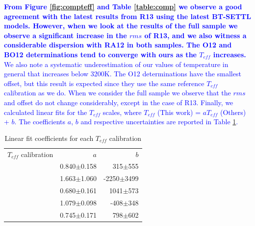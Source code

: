 \documentclass{aa}
\begin{document}
\textcolor{blue}{\textbf{From Figure \ref{fig:compteff} and Table \ref{table:comp} we observe a good agreement with the latest results from R13 using the latest BT-SETTL models. However, when we look at the results of the full sample we observe a significant increase in the $rms$ of R13, and we also witness a considerable dispersion with RA12 in both samples. The O12 and BO12 determinations tend to converge with ours as the $T_{eff}$ increases.}} 
\textcolor{blue}{We also note a systematic underestimation of our values of temperature in general that increases below 3200K. The O12 determinations have the smallest offset, but this result is expected since they use the same reference $T_{eff}$ calibration as we do. When we consider the full sample we observe that the $rms$ and offset do not change considerably, except in the case of R13.}
\textcolor{blue}{Finally, we calculated linear fits for the $T_{eff}$ scales, where $T_{eff}$ (This work) = $aT_{eff}$ (Others) + $b$. The coefficients $a$, $b$ and respective uncertainties are reported in Table \ref{table:fit_teff}. 
}

\begin{table}[h!]
\centering
\caption[]{Linear fit coefficients for each $T_{eff}$ calibration}
\label{table:fit_teff}
\begin{tabular}{l r r}
\hline
\hline
$T_{eff}$ calibration & $a$ & $b$ \\
\citet{Rojas-Ayala-2012}  &  0.840$\pm$0.158 & 315$\pm$555 \\
\citet{Onehag-2012} &  1.663$\pm$1.060 & -2250$\pm$3499 \\
\citet{Mann-2013b}  &  0.680$\pm$0.161 & 1041$\pm$573 \\
\citet{Boyajian-2012} &  1.079$\pm$0.098 & -408$\pm$348 \\
\citet{Rajpurohit-2013a}  &  0.745$\pm$0.171 & 798$\pm$602 \\
\hline
\end{tabular}
\end{table}



\end{document}

